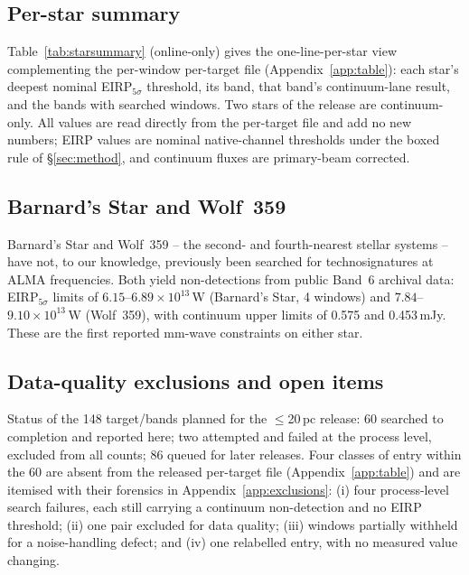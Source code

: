 \documentclass{openjournal}
\begin{document}
\subsection{Per-star summary}
\label{sec:starsummary}

Table~\ref{tab:starsummary} (online-only) gives the one-line-per-star
view complementing the per-window per-target file
(Appendix~\ref{app:table}): each star's deepest nominal
EIRP$_{5\sigma}$ threshold, its band, that band's continuum-lane
result, and the bands with searched windows. Two stars of the release
are continuum-only. All values are read directly from the per-target
file and add no new numbers; EIRP values are nominal native-channel
thresholds under the boxed rule of \S\ref{sec:method}, and continuum
fluxes are primary-beam corrected.


\subsection{Barnard's Star and Wolf~359}
\label{sec:barnardswolf}

Barnard's Star and Wolf~359 -- the second- and fourth-nearest stellar
systems -- have not, to our knowledge, previously been searched for
technosignatures at ALMA frequencies. Both yield non-detections from
public Band~6 archival data: EIRP$_{5\sigma}$ limits of
$6.15$--$6.89\times10^{13}$\,W (Barnard's Star, 4 windows) and
$7.84$--$9.10\times10^{13}$\,W (Wolf~359), with continuum upper limits
of 0.575 and 0.453\,mJy. These are the first reported mm-wave
constraints on either star.

\subsection{Data-quality exclusions and open items}
\label{sec:exclusions}

Status of the 148 target/bands planned for the $\le$20\,pc release:
60 searched to completion and reported here; two attempted and failed
at the process level, excluded from all counts; 86 queued for later
releases. Four classes of entry within the 60
are absent from the released per-target file
(Appendix~\ref{app:table}) and are itemised with their forensics in
Appendix~\ref{app:exclusions}: (i) four process-level search failures,
each still carrying a continuum non-detection and no EIRP threshold;
(ii) one pair excluded for data quality; (iii) windows partially
withheld for a noise-handling defect; and (iv) one relabelled entry,
with no measured value changing.
\end{document}
